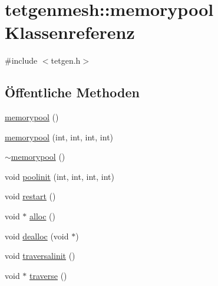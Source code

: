 \hypertarget{classtetgenmesh_1_1memorypool}{\section{tetgenmesh\-:\-:memorypool Klassenreferenz}
\label{classtetgenmesh_1_1memorypool}
}


{\ttfamily \#include $<$tetgen.\-h$>$}

\subsection*{Öffentliche Methoden}
\begin{DoxyCompactItemize}
\item 
\hyperlink{classtetgenmesh_1_1memorypool_a101ca0a62a9baaa0a636d1ee207a3068}{memorypool} ()
\item 
\hyperlink{classtetgenmesh_1_1memorypool_a11c634d40b58e7a23cffb0ca1e9fcbec}{memorypool} (int, int, int, int)
\item 
\hyperlink{classtetgenmesh_1_1memorypool_a66f5279cdde550dc9359115765d40dce}{$\sim$memorypool} ()
\item 
void \hyperlink{classtetgenmesh_1_1memorypool_af1e55812acd2838a7566ea97f7af85c1}{poolinit} (int, int, int, int)
\item 
void \hyperlink{classtetgenmesh_1_1memorypool_a8a34eeaa526e3a27ac9187ff1ead2938}{restart} ()
\item 
void $\ast$ \hyperlink{classtetgenmesh_1_1memorypool_a9631e38a788a91ae067a756232b515ab}{alloc} ()
\item 
void \hyperlink{classtetgenmesh_1_1memorypool_a0329d16675985efd7fd1e0a0630cabf7}{dealloc} (void $\ast$)
\item 
void \hyperlink{classtetgenmesh_1_1memorypool_a623b101e4e2f249d8b7e5dba65c3f7e2}{traversalinit} ()
\item 
void $\ast$ \hyperlink{classtetgenmesh_1_1memorypool_a151fe73459d0fa9a7262d0030fecf291}{traverse} ()
\end{DoxyCompactItemize}
